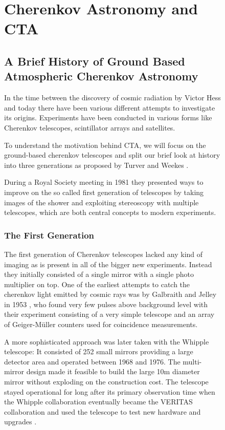 \begin{figure}
\chapter{Cherenkov Astronomy and CTA}
\label{cta}


\section{A Brief History of Ground Based Atmospheric Cherenkov Astronomy}
In the time between the discovery of cosmic radiation by Victor Hess
and today there have been various different attempts to investigate its origins.
Experiments have been conducted in various forms like Cherenkov telescopes, scintillator 
arrays and satellites.

To understand the motivation behind CTA, 
we will focus on the ground-based 
cherenkov telescopes and split our brief look at history 
into three generations as proposed by Turver and Weekes \cite{turver1980}.

During a Royal Society meeting in 1981 they presented ways to improve on
the so called first generation of telescopes by taking images of the shower
and exploiting stereoscopy with multiple telescopes, which are both central
concepts to modern experiments.

\subsection{The First Generation}
\label{sec:1stgen_iact}
The first generation of Cherenkov telescopes 
lacked any kind of imaging as is present in all of the bigger new experiments.
Instead they initially consisted of a single mirror with a single photo multiplier on top.
One of the earliest attempts to catch the cherenkov light emitted by cosmic rays 
was by Galbraith and Jelley in 1953 \cite{1953Natur.171..349G}, who found very few pulses
above background level with their experiment consisting of a very simple 
telescope and an array of Geiger-Müller counters used for coincidence measurements.

A more sophisticated approach was later taken with the Whipple telescope:
It consisted of 252 small mirrors providing a large detector area and operated between 
1968 and 1976. The multi-mirror design made it feasible to build the large 10m diameter 
mirror without exploding on the construction cost.
The telescope stayed operational for long after its primary observation time
when the Whipple collaboration eventually became the VERITAS collaboration 
and used the telescope to test new hardware and upgrades \cite{whipple1968}.



\end{figure}
